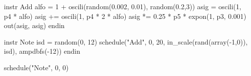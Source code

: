 instr Add
  alfo = 1 + oscili(random(0.002, 0.01), random(0.2,3))
  asig = oscili(1, p4 * alfo)
  asig += oscili(1, p4 * 2 * alfo)
  asig *= 0.25 * p5 * expon(1, p3, 0.001)  
  out(asig, asig)
endin

instr Note
  isd = random(0, 12)
  schedule("Add", 0, 20, in_scale(rand(array(-1,0)), isd), ampdbfs(-12))
endin

schedule("Note", 0, 0)